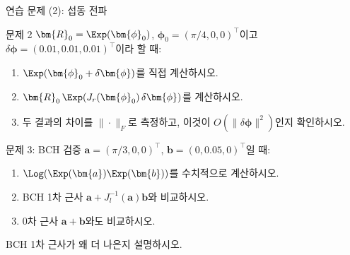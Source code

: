 \begin{frame}{연습 문제 (2): 섭동 전파}
  \begin{block}{문제 2}
    $\bm{R}_0 = \Exp(\bm{\phi}_0)$, $\bm{\phi}_0 = (\pi/4, 0, 0)^\top$이고\\
    $\delta\bm{\phi} = (0.01, 0.01, 0.01)^\top$이라 할 때:
    \begin{enumerate}
      \item $\Exp(\bm{\phi}_0 + \delta\bm{\phi})$를 직접 계산하시오.
      \item $\bm{R}_0\,\Exp(J_r(\bm{\phi}_0)\,\delta\bm{\phi})$를 계산하시오.
      \item 두 결과의 차이를 $\|\cdot\|_F$로 측정하고, 이것이 $O(\|\delta\bm{\phi}\|^2)$인지 확인하시오.
    \end{enumerate}
  \end{block}
  \pause
  \begin{block}{문제 3: BCH 검증}
    $\bm{a} = (\pi/3, 0, 0)^\top$, $\bm{b} = (0, 0.05, 0)^\top$일 때:
    \begin{enumerate}
      \item $\Log(\Exp(\bm{a})\Exp(\bm{b}))$를 수치적으로 계산하시오.
      \item BCH 1차 근사 $\bm{a} + J_l^{-1}(\bm{a})\bm{b}$와 비교하시오.
      \item 0차 근사 $\bm{a} + \bm{b}$와도 비교하시오.
    \end{enumerate}
    BCH 1차 근사가 왜 더 나은지 설명하시오.
  \end{block}
\end{frame}


